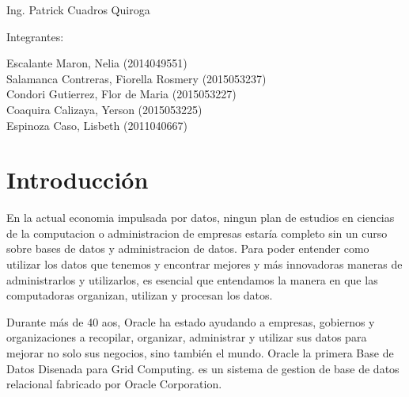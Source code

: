\documentclass[12pt,letterpaper]{article}
\begin{document}
\begin{titlepage}
\begin{center}
\vspace*{0.1in}
\begin{large}
 Ing. Patrick Cuadros Quiroga\\
\end{large}

\vspace*{0.2in}
\vspace*{0.1in}
\begin{large}
Integrantes: \\
\begin{flushleft}
Escalante Maron, Nelia 		\hfill	(2014049551) \\
Salamanca Contreras, Fiorella Rosmery		\hfill	(2015053237) \\
Condori Gutierrez, Flor de Maria            	\hfill	(2015053227) \\
Coaquira Calizaya, Yerson      	\hfill	(2015053225) \\
Espinoza Caso, Lisbeth  		\hfill	(2011040667) \\
\end{flushleft}
\end{large}
\end{center}

\end{titlepage}


 \tableofcontents
 \newpage

 
\section{Introducci\'on} 
En la actual economia impulsada por datos, ningun plan de estudios en ciencias de la computacion o administracion de empresas estaría completo sin un curso sobre bases de datos y administracion de datos. Para poder entender como utilizar los datos que tenemos y encontrar mejores y más innovadoras maneras de administrarlos y utilizarlos, es esencial que entendamos la manera en que las computadoras organizan, utilizan y procesan los datos.

Durante más de 40 aos, Oracle ha estado ayudando a empresas, gobiernos y organizaciones a recopilar, organizar, administrar y utilizar sus datos para mejorar no solo sus negocios, sino también el mundo. 
Oracle la primera Base de Datos Disenada para Grid Computing. es un sistema de gestion de  base de datos relacional fabricado por Oracle Corporation.
\end{document}
